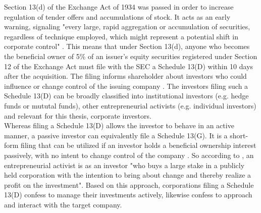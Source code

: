 \documentclass[12pt]{article}
\begin{document}
Section 13(d) of the Exchange Act of 1934 was passed in order to increase regulation of tender offers and accumulations of stock.
It acts as an early warning, signaling "every large, rapid aggregation or accumulation of securities, regardless of technique employed, which might represent a potential shift in corporate control" \citep[p.2]{Morrison2015}. 
This means that under Section 13(d), anyone who becomes the beneficial owner of 5\% of an issuer's equity securities registered under Section 12 of the Exchange Act must file with the SEC a Schedule 13(D) within 10 days after the acquisition. The filing informs shareholder about investors who could influence or change control of the issuing company \citep[p.110]{Giglia2016}. The investors filing such a Schedule 13(D) can be broadly classified into institutional investors (e.g. hedge funds or mututal funds), other entrepreneurial activists (e.g. individual investors) \citep[p.188]{Klein2009} and relevant for this thesis, corporate investors.\\
Whereas filing a Schedule 13(D) allows the investor to behave in an active manner, a passive investor can equivalently file a Schedule 13(G). It is a short-form filing that can be utilized if an investor holds a beneficial ownership interest passively, with no intent to change control of the company \citep{Giglia2016}. So according to \citet[p.187]{Klein2009}, an entrepreneurial activist is as an investor "who buys a large stake in a publicly held corporation with the intention to bring about change and thereby realize a profit on the investment". Based on this approach, corporations filing a Schedule 13(D) confess to manage their investments actively, likewise confess to approach and interact with the target company. 
\end{document}

